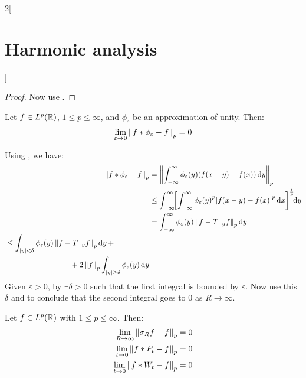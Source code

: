 \documentclass[../../../main_math.tex]{subfiles}
\begin{document}
\begin{multicols}{2}[\section{Harmonic analysis}]
\begin{proof}
    Now use .
  \end{proof}
  \begin{theorem}\label{HA:kernelConvLp}
    Let $f\in L^p(\mathbb{R})$, $1\leq p\leq\infty$, and $\phi_\varepsilon$ be an approximation of unity. Then:
    \begin{equation*}
      \lim_{\varepsilon\to 0}\left\|f*\phi_\varepsilon-f\right\|_p =0 \\
    \end{equation*}
  \end{theorem}
  \begin{sproof}
    Using , we have:
    \begin{align*}
      \norm{f*\phi_\varepsilon-f}_p & =\norm{\int_{-\infty}^{\infty}\phi_\varepsilon(y)(f(x-y)-f(x))\dd{y}}_p                                                                       \\
                                    & \leq\int_{-\infty}^{\infty}\!\!{\left[\int_{-\infty}^{\infty}{\phi_\varepsilon(y)}^p\abs{f(x-y)-f(x)}^p\dd{x}\right]}^{\frac{1}{p}}\!\!\dd{y} \\
                                    & = \int_{-\infty}^{\infty}\phi_\varepsilon(y)\norm{f-T_{-y}f}_p\dd{y}                                                                          \\
      \begin{split}
        & \leq \int_{\abs{y}< \delta}\phi_\varepsilon(y)\norm{f-T_{-y}f}_p\dd{y}+\\
        &\hspace{3cm}+2\norm{f}_p\int_{\abs{y}\geq\delta}\phi_\varepsilon(y)\dd{y}
      \end{split}
    \end{align*}
    Given $\varepsilon>0$, by  $\exists\delta>0$ such that the first integral is bounded by $\varepsilon$. Now use this $\delta$ and  to conclude that the second integral goes to 0 as $R\to\infty$.
  \end{sproof}
  \begin{corollary}
    Let $f\in L^p(\mathbb{R})$ with $1\leq p\leq\infty$. Then:
    \begin{align*}
      \lim_{R\to\infty}\left\|\sigma_Rf-f\right\|_p & =0 \\
      \lim_{t\to 0}\left\|f*P_t-f\right\|_p         & =0 \\
      \lim_{t\to 0}\left\|f*W_t-f\right\|_p         & =0
    \end{align*}
  \end{corollary}

\end{multicols}
\end{document}
